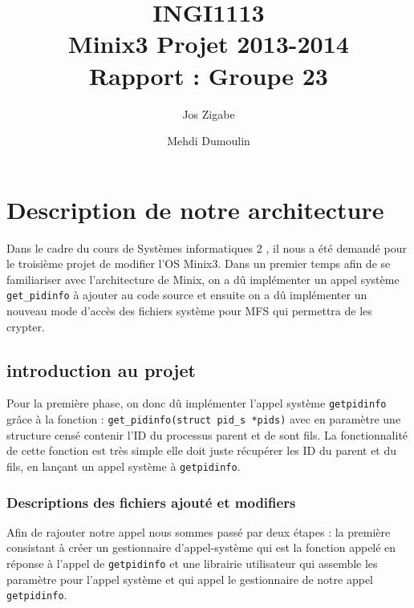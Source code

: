 \documentclass[10pt, onecolumn] {IEEEtran}
\title{INGI1113\\
Minix3 Projet 2013-2014\\
Rapport : Groupe 23}
\author{Jos Zigabe  \and Mehdi Dumoulin}
\begin{document}
\maketitle
\tableofcontents
\newpage

\section{Description de notre architecture}

Dans le cadre du cours de \og Systèmes informatiques 2 \fg, il nous a été demandé pour le troisième projet de modifier l'OS Minix3. Dans un premier temps afin de se familiariser avec l'architecture de Minix, on a dû implémenter un appel système \texttt{get\_pidinfo} à ajouter au code source et ensuite on a dû implémenter un nouveau mode d'accès des fichiers système pour MFS qui permettra de les crypter.      

\subsection{introduction au projet}

Pour la première phase, on donc dû implémenter l'appel système \texttt{getpidinfo} grâce à la fonction : \texttt{get\_pidinfo(struct pid\_s *pids)} avec en paramètre une structure censé contenir l'ID du processus parent et de sont fils. La fonctionnalité de cette fonction est très simple elle doit juste récupérer les ID du parent et du fils, en lançant un appel système à  \texttt{getpidinfo}.\\

\subsubsection{Descriptions des fichiers ajouté et modifiers}

Afin de rajouter notre appel nous sommes passé par deux étapes : la première consistant à créer un gestionnaire d'appel-système qui est la fonction appelé en réponse à l'appel de \texttt{getpidinfo} et une librairie utilisateur qui assemble les paramètre pour l'appel système et qui appel le gestionnaire de notre appel  \texttt{getpidinfo}.\\
\end{document}
